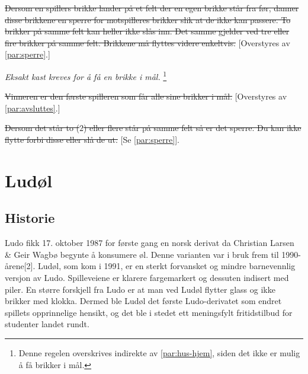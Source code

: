\documentclass[10pt,a4paper,norsk,openany]{book}
\begin{document}
\begin{ludo}
  \item \sout{Dersom en spillers brikke lander på et felt der en egen brikke
    står fra før, danner disse brikkene en sperre for motspilleres brikker slik at
    de ikke kan passere. To brikker på samme felt kan heller ikke slås inn. Det
    samme gjelder ved tre eller fire brikker på samme felt. Brikkene må flyttes
    videre enkeltvis.} [Overstyres av \cref{par:sperre}.]
   
  \item \emph{Eksakt kast kreves for å få en brikke i mål.} \footnote{Denne
    regelen overskrives indirekte av \cref{par:hus-hjem}, siden det ikke er
    mulig å få brikker i mål.}
   
  \item \sout{Vinneren er den første spilleren som får alle sine brikker i mål.}
    [Overstyres av \cref{par:avsluttes}.]
  
  \item \sout{Dersom det står to ($2$) eller flere står på samme felt så er det
    sperre. Du kan ikke flytte forbi disse eller slå de ut.} [Se \cref{par:sperre}].
\end{ludo}

\chapter{Ludøl}

\section{Historie}

Ludo fikk 17. oktober 1987 for første gang en norsk derivat da Christian Larsen
\& Geir Wagbø
begynte å konsumere øl. Denne varianten var i bruk frem til 1990-årene[2].
Ludøl, som kom i 1991, er en sterkt forvansket og mindre barnevennlig versjon av
Ludo. Spilleveiene er klarere fargemarkert og dessuten indisert med piler.
En større forskjell fra Ludo er at man ved Ludøl flytter glass og ikke
brikker med klokka.
Dermed ble Ludøl det første Ludo-derivatet som endret spillets opprinnelige
hensikt, og det ble i stedet ett meningsfylt fritidstilbud for studenter landet rundt.
\end{document}
